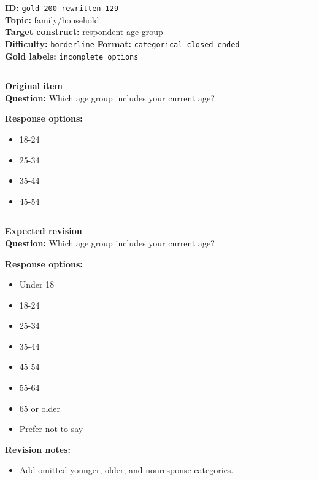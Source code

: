 \documentclass[10pt,a4paper]{article}
\newcommand{\sectionline}{\vspace{0.15em}\hrule\vspace{0.35em}}
\begin{document}
\begin{tcolorbox}[colframe=FlawRed,colback=white,colbacktitle=FlawRed!9,coltitle=black,title={Item 129\hfill Flawed item}]
\textbf{ID:} \texttt{gold-200-rewritten-129}\\
\textbf{Topic:} family/household\\
\textbf{Target construct:} respondent age group\\
\textbf{Difficulty:} \texttt{borderline} \quad \textbf{Format:} \texttt{categorical\_closed\_ended}\\
\textbf{Gold labels:} \texttt{incomplete\_options}\\
\sectionline
\textbf{Original item}\\
\textbf{Question:} Which age group includes your current age?
\par\textbf{Response options:}
\begin{itemize}
\item 18-24
\item 25-34
\item 35-44
\item 45-54
\end{itemize}
\sectionline
\textbf{Expected revision}\\
\textbf{Question:} Which age group includes your current age?
\par\textbf{Response options:}
\begin{itemize}
\item Under 18
\item 18-24
\item 25-34
\item 35-44
\item 45-54
\item 55-64
\item 65 or older
\item Prefer not to say
\end{itemize}
\par\textbf{Revision notes:}
\begin{itemize}
\item Add omitted younger, older, and nonresponse categories.
\end{itemize}
\end{tcolorbox}
\end{document}
